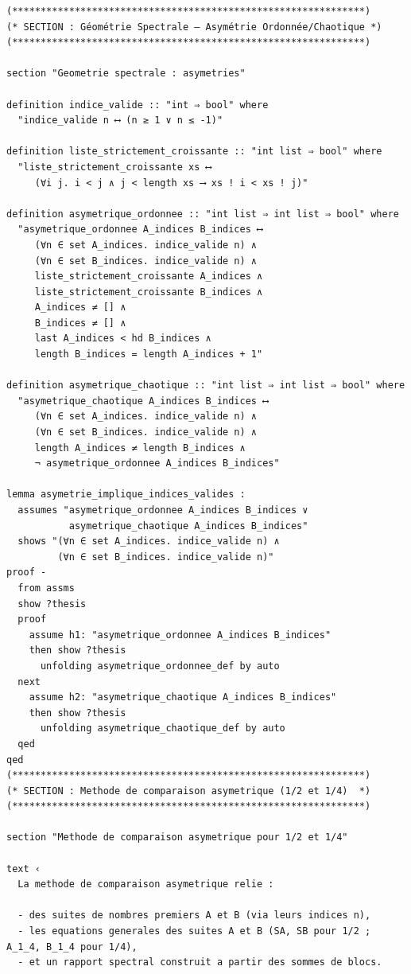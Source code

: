\documentclass[a4paper,11pt]{article}
\begin{document}
\begin{holcode}[title={\textcolor{white}{Fichier : methode\_spectral.thy -- Partie 1/4}}]
\begin{lstlisting}
(**************************************************************)
(* SECTION : Géométrie Spectrale — Asymétrie Ordonnée/Chaotique *)
(**************************************************************)

section "Geometrie spectrale : asymetries"

definition indice_valide :: "int ⇒ bool" where
  "indice_valide n ⟷ (n ≥ 1 ∨ n ≤ -1)"

definition liste_strictement_croissante :: "int list ⇒ bool" where
  "liste_strictement_croissante xs ⟷
     (∀i j. i < j ∧ j < length xs ⟶ xs ! i < xs ! j)"

definition asymetrique_ordonnee :: "int list ⇒ int list ⇒ bool" where
  "asymetrique_ordonnee A_indices B_indices ⟷
     (∀n ∈ set A_indices. indice_valide n) ∧
     (∀n ∈ set B_indices. indice_valide n) ∧
     liste_strictement_croissante A_indices ∧
     liste_strictement_croissante B_indices ∧
     A_indices ≠ [] ∧
     B_indices ≠ [] ∧
     last A_indices < hd B_indices ∧
     length B_indices = length A_indices + 1"

definition asymetrique_chaotique :: "int list ⇒ int list ⇒ bool" where
  "asymetrique_chaotique A_indices B_indices ⟷
     (∀n ∈ set A_indices. indice_valide n) ∧
     (∀n ∈ set B_indices. indice_valide n) ∧
     length A_indices ≠ length B_indices ∧
     ¬ asymetrique_ordonnee A_indices B_indices"

lemma asymetrie_implique_indices_valides :
  assumes "asymetrique_ordonnee A_indices B_indices ∨
           asymetrique_chaotique A_indices B_indices"
  shows "(∀n ∈ set A_indices. indice_valide n) ∧
         (∀n ∈ set B_indices. indice_valide n)"
proof -
  from assms
  show ?thesis
  proof
    assume h1: "asymetrique_ordonnee A_indices B_indices"
    then show ?thesis
      unfolding asymetrique_ordonnee_def by auto
  next
    assume h2: "asymetrique_chaotique A_indices B_indices"
    then show ?thesis
      unfolding asymetrique_chaotique_def by auto
  qed
qed
(**************************************************************)
(* SECTION : Methode de comparaison asymetrique (1/2 et 1/4)  *)
(**************************************************************)

section "Methode de comparaison asymetrique pour 1/2 et 1/4"

text ‹
  La methode de comparaison asymetrique relie :

  - des suites de nombres premiers A et B (via leurs indices n),
  - les equations generales des suites A et B (SA, SB pour 1/2 ; A_1_4, B_1_4 pour 1/4),
  - et un rapport spectral construit a partir des sommes de blocs.


\end{lstlisting}
\end{holcode}
\end{document}
